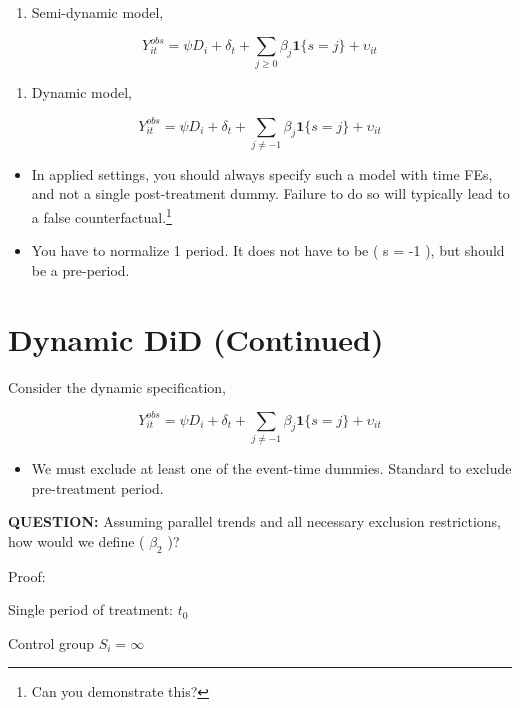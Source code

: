 \documentclass[
  letterpaper,
  DIV=11,
  numbers=noendperiod]{scrreprt}
\providecommand{\tightlist}{%
  \setlength{\itemsep}{0pt}\setlength{\parskip}{0pt}}\usepackage{longtable,booktabs,array}
\theoremstyle{definition}
\theoremstyle{remark}
\begin{document}
\begin{enumerate}
  \begin{enumerate}
  \def\labelenumii{\arabic{enumii}.}
  \tightlist
  \item
    Semi-dynamic model,
  \end{enumerate}

  \[
  Y^{obs}_{it} = \psi D_i + \delta_t + \sum_{j \geq 0} \beta_j \mathbf{1}\{s = j\} + \upsilon_{it}
  \]

  \begin{enumerate}
  \def\labelenumii{\arabic{enumii}.}
  \setcounter{enumii}{1}
  \tightlist
  \item
    Dynamic model,
  \end{enumerate}

  \[
  Y^{obs}_{it} = \psi D_i + \delta_t + \sum_{j \neq -1} \beta_j \mathbf{1}\{s = j\} + \upsilon_{it}
  \]

  \begin{itemize}
  \tightlist
  \item
    In applied settings, you should always specify such a model with
    time FEs, and not a single post-treatment dummy. Failure to do so
    will typically lead to a false counterfactual.\footnote{Can you
      demonstrate this?}
  \item
    You have to normalize 1 period. It does not have to be ( s = -1 ),
    but should be a pre-period.
  \end{itemize}

  \section{Dynamic DiD (Continued)}\label{dynamic-did-continued}

  Consider the dynamic specification,

  \[
  Y^{obs}_{it} = \psi D_i + \delta_t + \sum_{j \neq -1} \beta_j \mathbf{1}\{s = j\} + \upsilon_{it}
  \]

  \begin{itemize}
  \tightlist
  \item
    We must exclude at least one of the event-time dummies. Standard to
    exclude pre-treatment period.
  \end{itemize}

  \textbf{QUESTION:} Assuming parallel trends and all necessary
  exclusion restrictions, how would we define ( \(\beta_2\) )?

  Proof:

  Single period of treatment: \(t_0\)

  Control group \(S_i = \infty\)


\end{enumerate}
\end{document}
